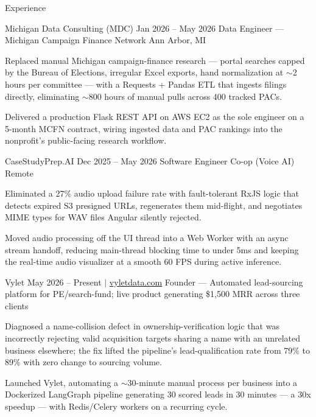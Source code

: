 \documentclass[
	11pt
]{../../../template}
\begin{document}
	\begin{rSection}{E}{xperience}
		\begin{rSectionEntry}
			{Michigan Data Consulting (MDC)}
			{Jan 2026 -- May 2026}
			{Data Engineer --- Michigan Campaign Finance Network}
			{}
			{Ann Arbor, MI}

			\item Replaced manual Michigan campaign-finance research --- portal searches capped by the Bureau of Elections, irregular Excel exports, hand normalization at $\sim$2 hours per committee --- with a Requests + Pandas ETL that ingests filings directly, eliminating $\sim$800 hours of manual pulls across 400 tracked PACs.
			\item Delivered a production Flask REST API on AWS EC2 as the sole engineer on a 5-month MCFN contract, wiring ingested data and PAC rankings into the nonprofit's public-facing research workflow.
		\end{rSectionEntry}

		\begin{rSectionEntry}
			{CaseStudyPrep.AI}
			{Dec 2025 -- May 2026}
			{Software Engineer Co-op (Voice AI)}
			{}
			{Remote}

			\item Eliminated a 27\% audio upload failure rate with fault-tolerant RxJS logic that detects expired S3 presigned URLs, regenerates them mid-flight, and negotiates MIME types for WAV files Angular silently rejected.
			\item Moved audio processing off the UI thread into a Web Worker with an async stream handoff, reducing main-thread blocking time to under 5ms and keeping the real-time audio visualizer at a smooth 60 FPS during active inference.
		\end{rSectionEntry}

		\begin{rSectionEntry}
			{Vylet}
			{May 2026 -- Present $\vert$ \href{https://vyletdata.com}{vyletdata.com}}
			{Founder --- Automated lead-sourcing platform for PE/search-fund; live product generating \$1,500 MRR across three clients}
			{}
			{}

			\item Diagnosed a name-collision defect in ownership-verification logic that was incorrectly rejecting valid acquisition targets sharing a name with an unrelated business elsewhere; the fix lifted the pipeline's lead-qualification rate from 79\% to 89\% with zero change to sourcing volume.
			\item Launched Vylet, automating a $\sim$30-minute manual process per business into a Dockerized LangGraph pipeline generating 30 scored leads in 30 minutes --- a 30x speedup --- with Redis/Celery workers on a recurring cycle.
		\end{rSectionEntry}


\end{rSection}
\end{document}
